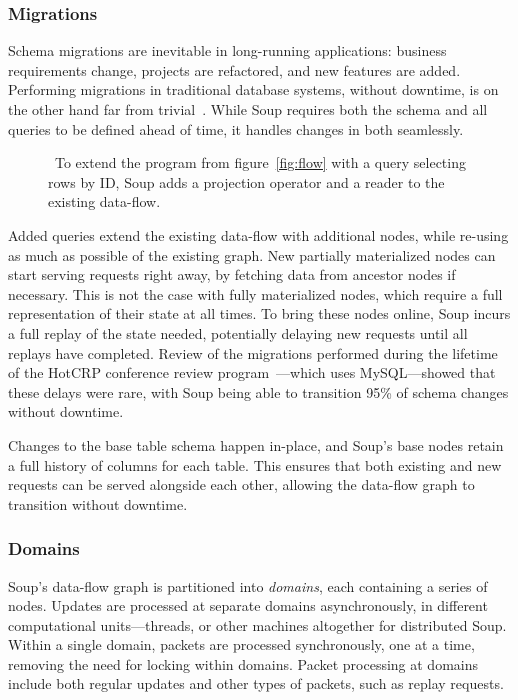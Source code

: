 \subsubsection{Migrations}

Schema migrations are inevitable in long-running applications: business
requirements change, projects are refactored, and new features are added.
Performing migrations in traditional database systems, without downtime, is on
the other hand far from trivial~\cite{stripe, gh-ost}. While Soup requires both
the schema and all queries to be defined ahead of time, it handles changes in
both seamlessly.

\begin{figure}[H]
  \centering
  
  \caption{\
    To extend the program from figure~\ref{fig:flow} with a
    query selecting rows by ID, Soup adds a projection operator and a reader to
    the existing data-flow.
  }\label{fig:migrate}
\end{figure}

Added queries extend the existing data-flow with additional nodes, while
re-using as much as possible of the existing graph. New partially materialized
nodes can start serving requests right away, by fetching data from ancestor
nodes if necessary. This is not the case with fully materialized nodes, which
require a full representation of their state at all times. To bring these nodes
online, Soup incurs a full replay of the state needed, potentially delaying new
requests until all replays have completed. Review of the migrations performed
during the lifetime of the HotCRP conference review
program~\cite{hotcrp}---which uses MySQL---showed that these delays were rare,
with Soup being able to transition 95\% of schema changes without downtime.

Changes to the base table schema happen in-place, and Soup's base nodes retain a
full history of columns for each table. This ensures that both existing and new
requests can be served alongside each other, allowing the data-flow graph to
transition without downtime.

\subsubsection{Domains}

Soup's data-flow graph is partitioned into \textit{domains}, each containing a
series of nodes. Updates are processed at separate domains asynchronously, in
different computational units---threads, or other machines altogether for
distributed Soup. Within a single domain, packets are processed synchronously,
one at a time, removing the need for locking within domains. Packet processing
at domains include both regular updates and other types of packets, such as
replay requests.


